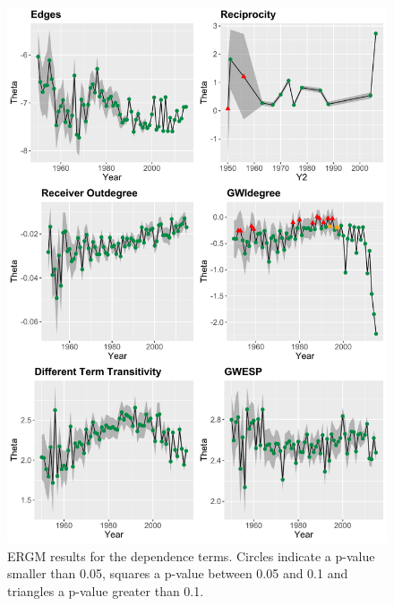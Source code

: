 \documentclass[headsepline=true, abstracton]{scrartcl}
\begin{document}

   
   
  \begin{figure}[H]
\includegraphics[width=16cm]{SCC_Results_1}
\caption{ERGM results for the dependence terms. Circles indicate a p-value smaller than 0.05, squares a p-value between 0.05 and 0.1 and triangles a p-value greater than 0.1. }
 \label{SCC_results_1}

\vspace{-.25cm}
\end{figure}  
\end{document}
